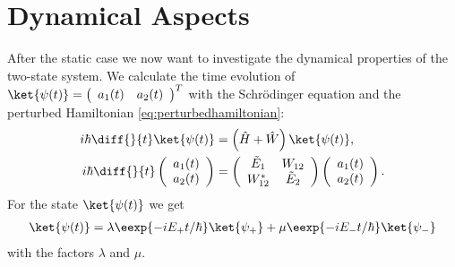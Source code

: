 \section{Dynamical Aspects}
				After the static case we now want to investigate the dynamical properties of the two-state system. We calculate the time evolution of $\ket{\psi(t)} = \left(\begin{array}{cc} a_1(t) & a_2(t)\end{array}\right)^T$ with the Schrödinger equation and the perturbed Hamiltonian \eqref{eq:perturbedhamiltonian}:
				\begin{align}
					i\hbar \diff{}{t}\ket{\psi(t)}&=\left(\hat{H}+\hat{W}\right)\ket{\psi(t)},\\
					i\hbar \diff{}{t}\left(\begin{array}{c} a_1(t) \\ a_2(t) \end{array}\right) &= \left( \begin{array}{cc} \tilde{E}_1 & W_{12} \\ W_{12}^* & \tilde{E}_2 \end{array} \right) \left(\begin{array}{c} a_1(t) \\ a_2(t) \end{array} \right).
				\end{align}
				For the state $\ket{\psi(t)}$ we get
				\begin{align}
					\ket{\psi(t)}=\lambda \eexp{-i{E_+}t/{\hbar}} \ket{\psi_+} + \mu \eexp{-i{E_-}t/{\hbar}} \ket{\psi_-} \label{eq:psitimeevolution}
				\end{align}
				with the factors $\lambda$ and $\mu$.

